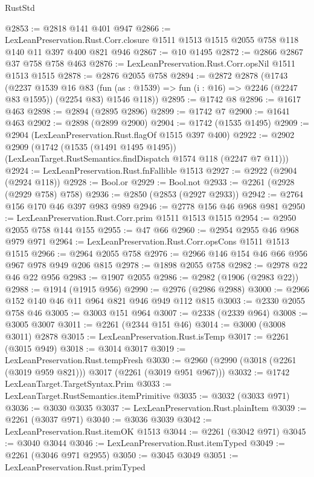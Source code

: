 \begin{lexlean}{RustStd}
\begin{coremodule}
@2853 := @2818 @141 @401 @947
@2866 := LexLeanPreservation.Rust.Corr.closure
    @1511
    @1513
    @1515
    @2055
    @758
    @118
    @140
    @11
    @397
    @400
    @821
    @946
@2867 := @10 @1495
@2872 := @2866 @2867 @37 @758 @758 @463
@2876 := LexLeanPreservation.Rust.Corr.opsNil @1511 @1513 @1515
@2878 := @2876 @2055 @758
@2894 := @2872
    @2878
    (@1743
      (@2237
        @1539
        @16
        @83
        (fun (as : @1539) => fun (i : @16) => @2246 (@2247 @83 @1595))
        (@2254 @83)
        @1546
        @118))
@2895 := @1742 @8
@2896 := @1617 @463
@2898 := @2894 (@2895 @2896)
@2899 := @1742 @7
@2900 := @1641 @463
@2902 := @2898 (@2899 @2900)
@2904 := @1742 (@1535 @1495)
@2909 := @2904 (LexLeanPreservation.Rust.flagOf @1515 @397 @400)
@2922 := @2902
    @2909
    (@1742
      (@1535 (@1491 @1495 @1495))
      (LexLeanTarget.RustSemantics.findDispatch @1574 @118 (@2247 @7 @11)))
@2924 := LexLeanPreservation.Rust.fnFallible @1513
@2927 := @2922 (@2904 (@2924 @118))
@2928 := Bool.or
@2929 := Bool.not
@2933 := @2261 (@2928 (@2929 @758) @758)
@2936 := @2850 (@2853 (@2927 @2933))
@2942 := @2764 @156 @170 @46 @397 @983 @989
@2946 := @2778 @156 @46 @968 @981
@2950 := LexLeanPreservation.Rust.Corr.prim @1511 @1513 @1515
@2954 := @2950 @2055 @758 @144 @155
@2955 := @47 @66
@2960 := @2954 @2955 @46 @968 @979 @971
@2964 := LexLeanPreservation.Rust.Corr.opsCons @1511 @1513 @1515
@2966 := @2964 @2055 @758
@2976 := @2966 @146 @154 @46 @66 @956 @967 @978 @949 @206 @815
@2978 := @1898 @2055 @758
@2982 := @2978 @22 @46 @22 @956
@2983 := @1907 @2055
@2986 := @2982 (@1906 (@2983 @22))
@2988 := @1914 (@1915 @956)
@2990 := @2976 (@2986 @2988)
@3000 := @2966 @152 @140 @46 @11 @964 @821 @946 @949 @112 @815
@3003 := @2330 @2055 @758 @46
@3005 := @3003 @151 @964
@3007 := @2338 (@2339 @964)
@3008 := @3005 @3007
@3011 := @2261 (@2344 @151 @46)
@3014 := @3000 (@3008 @3011) @2878
@3015 := LexLeanPreservation.Rust.isTemp
@3017 := @2261 (@3015 @949)
@3018 := @3014 @3017
@3019 := LexLeanPreservation.Rust.tempFresh
@3030 := @2960 (@2990 (@3018 (@2261 (@3019 @959 @821))) @3017 (@2261 (@3019 @951 @967)))
@3032 := @1742 LexLeanTarget.TargetSyntax.Prim
@3033 := LexLeanTarget.RustSemantics.itemPrimitive
@3035 := @3032 (@3033 @971)
@3036 := @3030 @3035
@3037 := LexLeanPreservation.Rust.plainItem
@3039 := @2261 (@3037 @971)
@3040 := @3036 @3039
@3042 := LexLeanPreservation.Rust.itemOK @1513
@3044 := @2261 (@3042 @971)
@3045 := @3040 @3044
@3046 := LexLeanPreservation.Rust.itemTyped
@3049 := @2261 (@3046 @971 @2955)
@3050 := @3045 @3049
@3051 := LexLeanPreservation.Rust.primTyped

\end{coremodule}
\end{lexlean}
